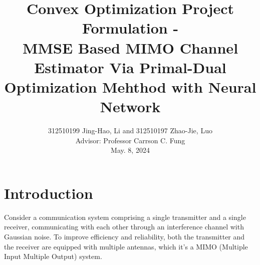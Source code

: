 \documentclass[journal,12pt,onecolumn,draftclsnofoot]{IEEEtran}
\begin{document}


    \title{ Convex Optimization Project Formulation -\\
    \huge  MMSE Based MIMO Channel Estimator Via Primal-Dual
    Optimization Mehthod with Neural Network}
    \author{312510199 Jing-Hao, Li and 312510197 Zhao-Jie, Luo\\
        Advisor: Professor Carrson C. Fung\\
        \small{May. 8, 2024}}


    \maketitle





    \section{Introduction}

        Consider a communication system comprising a single transmitter and a single receiver, communicating with each other through an interference channel with 
        Gaussian noise. To improve efficiency and reliability, both the transmitter and the receiver are equipped with multiple antennas, which it's a MIMO 
        (Multiple Input Multiple Output) system.
\end{document}
